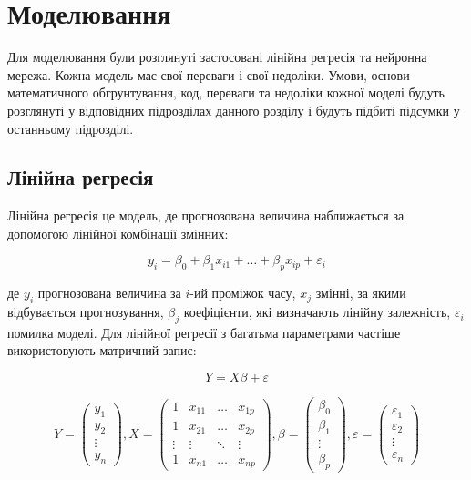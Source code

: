 \chapter{Моделювання}


Для моделювання були розглянуті застосовані лінійна регресія та нейронна мережа. 
Кожна модель має свої переваги і свої недоліки. 
Умови, основи математичного обгрунтування, код, переваги та недоліки кожної моделі будуть розглянуті у відповідних підрозділах данного розділу і будуть підбиті підсумки у останньому підрозділі.

\section{Лінійна регресія}

Лінійна регресія це модель, де прогнозована величина наближається за допомогою лінійної комбінації змінних:

$$y_i = \beta_0 + \beta_1 x_{i 1} + \dots + \beta_p x_{i p} + \varepsilon_i$$

де $y_i$ прогнозована величина за $i$-ий проміжок часу, $x_j$ змінні, за якими відбувається прогнозування, $\beta_j$ коефіцієнти, які визначають лінійну залежність, $\varepsilon_i$ помилка моделі. 
Для лінійної регресії з багатьма параметрами частіше використовують матричний запис:

$$Y = X\beta + \varepsilon$$

$$
Y = \begin{pmatrix}
        y_1 \\
        y_2 \\
        \vdots \\
        y_n
    \end{pmatrix}, 
X = \begin{pmatrix}
        1 & x_{1 1} & \dots & x_{1 p}\\
        1 & x_{2 1} & \dots & x_{2 p}\\
        \vdots & \vdots & \ddots & \vdots \\
        1 & x_{n 1} & \dots & x_{n p}
    \end{pmatrix}, 
\beta = \begin{pmatrix}
            \beta_0 \\
            \beta_1 \\ 
            \vdots \\
            \beta_p
        \end{pmatrix}, 
\varepsilon =   \begin{pmatrix}
                    \varepsilon_1 \\
                    \varepsilon_2 \\
                    \vdots \\
                    \varepsilon_n 
                \end{pmatrix}
$$

